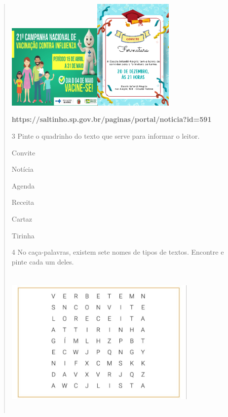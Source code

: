 {{{{\begin{verse}
{{\includegraphics[width=1.80556in,height=1.63403in]{media/image100.png}\includegraphics[width=1.51458in,height=2.14444in]{media/image103.png}

\textbf{https://saltinho.sp.gov.br/paginas/portal/noticia?id=591}

\num{3} Pinte o quadrinho do texto que serve para informar o leitor.



Convite

Notícia

Agenda 

Receita

Cartaz 

Tirinha

\num{4} No caça-palavras, existem sete nomes de tipos de textos. 
Encontre e pinte cada um deles.  


\includegraphics[width=3.68829in,height=2.89552in]{media/image104.jpeg}

}}
\end{verse}}}}}
